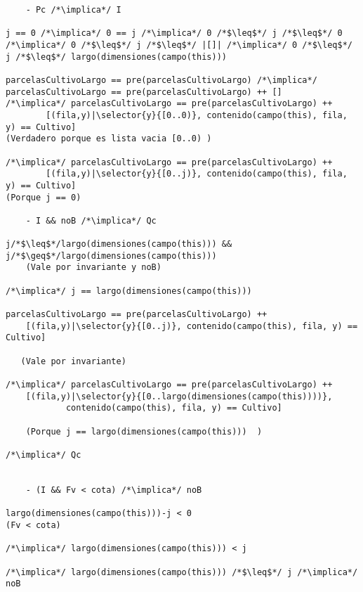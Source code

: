 \begin{lstlisting}
    - Pc /*\implica*/ I
   
j == 0 /*\implica*/ 0 == j /*\implica*/ 0 /*$\leq$*/ j /*$\leq$*/ 0
/*\implica*/ 0 /*$\leq$*/ j /*$\leq$*/ |[]| /*\implica*/ 0 /*$\leq$*/ j /*$\leq$*/ largo(dimensiones(campo(this)))

parcelasCultivoLargo == pre(parcelasCultivoLargo) /*\implica*/ 
parcelasCultivoLargo == pre(parcelasCultivoLargo) ++ []
/*\implica*/ parcelasCultivoLargo == pre(parcelasCultivoLargo) ++ 
		[(fila,y)|\selector{y}{[0..0)}, contenido(campo(this), fila, y) == Cultivo]
(Verdadero porque es lista vacia [0..0) )

/*\implica*/ parcelasCultivoLargo == pre(parcelasCultivoLargo) ++ 
		[(fila,y)|\selector{y}{[0..j)}, contenido(campo(this), fila, y) == Cultivo]
(Porque j == 0)

    - I && noB /*\implica*/ Qc

j/*$\leq$*/largo(dimensiones(campo(this))) && j/*$\geq$*/largo(dimensiones(campo(this)))
	(Vale por invariante y noB)

/*\implica*/ j == largo(dimensiones(campo(this)))

parcelasCultivoLargo == pre(parcelasCultivoLargo) ++ 
    [(fila,y)|\selector{y}{[0..j)}, contenido(campo(this), fila, y) == Cultivo]
  
   (Vale por invariante)

/*\implica*/ parcelasCultivoLargo == pre(parcelasCultivoLargo) ++ 
    [(fila,y)|\selector{y}{[0..largo(dimensiones(campo(this))))}, 
    		contenido(campo(this), fila, y) == Cultivo]

	(Porque j == largo(dimensiones(campo(this)))  )

/*\implica*/ Qc

	
    - (I && Fv < cota) /*\implica*/ noB
    
largo(dimensiones(campo(this)))-j < 0
(Fv < cota)

/*\implica*/ largo(dimensiones(campo(this))) < j

/*\implica*/ largo(dimensiones(campo(this))) /*$\leq$*/ j /*\implica*/ noB

\end{lstlisting}


